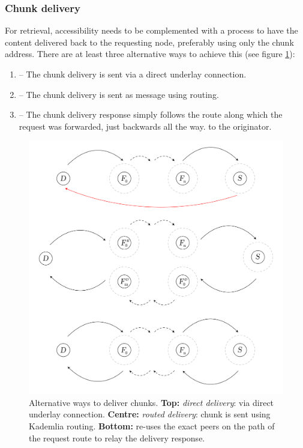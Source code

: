 \subsubsection{Chunk delivery}

For retrieval, accessibility needs to be complemented with a process to have the content delivered back to the requesting node, preferably using only the chunk address. There are at least three alternative ways to achieve this (see figure \ref{fig:chunk-delivery}):

\begin{enumerate}
    \item {} -- The chunk delivery is sent via a direct underlay connection. 
    \item {} -- The chunk delivery is sent as message using routing.
    \item {} -- The chunk delivery response simply follows the route along which the request was forwarded, just backwards all the way. to the originator.
\end{enumerate}


\begin{figure}[htbp]
   \centering
   \includegraphics[width=\textwidth]{fig/chunk-delivery.pdf}
   \caption[Alternative ways to deliver chunks: direct, routed and backward \statusgreen]{Alternative ways to deliver chunks. \textbf{Top:} \emph{direct delivery}: via direct underlay connection. \textbf{Centre:} \emph{routed delivery}: chunk is sent using Kademlia routing. \textbf{Bottom:}  re-uses the exact peers on the path of the request route to relay the delivery response.}
   \label{fig:chunk-delivery}
\end{figure}

